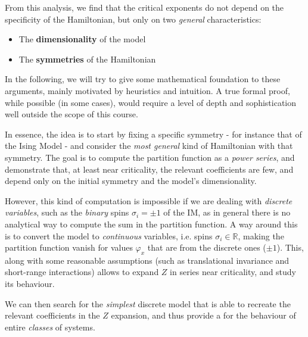 \documentclass[../../main.tex]{subfiles}
\begin{document}
\medskip

From this analysis, we find that the critical exponents do not depend on the specificity of the Hamiltonian, but only on two \textit{general} characteristics:
\begin{itemize}
    \item The \textbf{dimensionality} of the model
    \item The \textbf{symmetries} of the Hamiltonian  
\end{itemize}

In the following, we will try to give some mathematical foundation to these arguments, mainly motivated by heuristics and intuition. A true formal proof, while possible (in some cases), would require a level of depth and sophistication well outside the scope of this course.

\medskip

In essence, the idea is to start by fixing a specific symmetry - for instance that of the Ising Model - and consider the \textit{most general} kind of Hamiltonian with that symmetry. The goal is to compute the partition function as a \textit{power series}, and demonstrate that, at least near criticality, the relevant coefficients are few, and depend only on the initial symmetry and the model's dimensionality.

\medskip

However, this kind of computation is impossible if we are dealing with \textit{discrete variables}, such as the \textit{binary} spins $\sigma_i = \pm 1$ of the IM, as in general there is no analytical way to compute the sum in the partition function. A way around this is to convert the model to \textit{continuous} variables, i.e. spins $\sigma_i \in \mathbb{R}$, making the partition function vanish for values $\varphi_x$ that are  from the discrete ones ($\pm 1$). This, along with some reasonable assumptions (such as translational invariance and short-range interactions) allows to expand $Z$ in series near criticality, and study its behaviour. 

\medskip

We can then search for the \textit{simplest} discrete model that is able to recreate the relevant coefficients in the $Z$ expansion, and thus provide a  for the behaviour of entire \textit{classes} of systems.   
\end{document}
